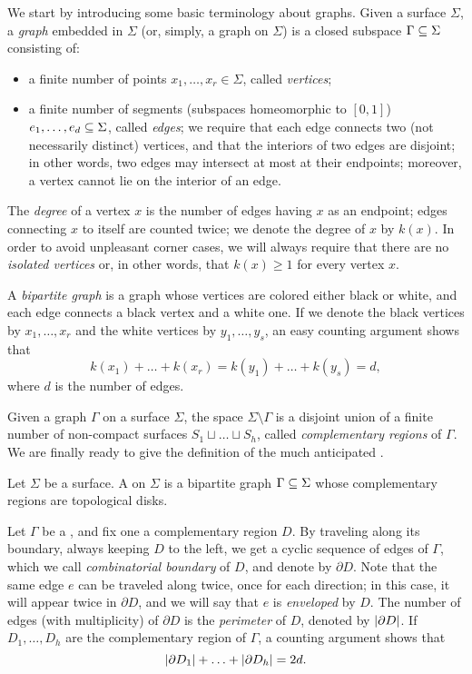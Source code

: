 We start by introducing some basic terminology about graphs. Given a surface $\Sigma$, a \emph{graph} embedded in $\Sigma$ (or, simply, a graph on $\Sigma$) is a closed subspace $\Gamma\subseteq\Sigma$ consisting of:
\begin{itemize}
\item a finite number of points $x_1,\ldots,x_r\in\Sigma$, called \emph{vertices};
\item a finite number of segments (subspaces homeomorphic to $[0,1]$) $e_1,\ldots,e_d\subseteq\Sigma$, called \emph{edges}; we require that each edge connects two (not necessarily distinct) vertices, and that the interiors of two edges are disjoint; in other words, two edges may intersect at most at their endpoints; moreover, a vertex cannot lie on the interior of an edge.
\end{itemize}
The \emph{degree} of a vertex $x$ is the number of edges having $x$ as an endpoint; edges connecting $x$ to itself are counted twice; we denote the degree of $x$ by $k(x)$. In order to avoid unpleasant corner cases, we will always require that there are no \emph{isolated vertices} or, in other words, that $k(x)\ge 1$ for every vertex $x$.

A \emph{bipartite graph} is a graph whose vertices are colored either black or white, and each edge connects a black vertex and a white one. If we denote the black vertices by $x_1,\ldots,x_r$ and the white vertices by $y_1,\ldots,y_s$, an easy counting argument shows that
\[
k(x_1)+\ldots+k(x_r)=k(y_1)+\ldots+k(y_s)=d,
\]
where $d$ is the number of edges.

Given a graph $\Gamma$ on a surface $\Sigma$, the space $\Sigma\setminus\Gamma$ is a disjoint union of a finite number of non-compact surfaces $S_1\sqcup\ldots\sqcup S_h$, called \emph{complementary regions} of $\Gamma$. We are finally ready to give the definition of the much anticipated \dessins{}.

\begin{definition}
Let $\Sigma$ be a surface. A \emph{\dessin{}} on $\Sigma$ is a bipartite graph $\Gamma\subseteq\Sigma$ whose complementary regions are topological disks.
\end{definition}


Let $\Gamma$ be a \dessin{}, and fix one a complementary region $D$. By traveling along its boundary, always keeping $D$ to the left, we get a cyclic sequence of edges of $\Gamma$, which we call \emph{combinatorial boundary} of $D$, and denote by $\partial D$. Note that the same edge $e$ can be traveled along twice, once for each direction; in this case, it will appear twice in $\partial D$, and we will say that $e$ is \emph{enveloped} by $D$. The number of edges (with multiplicity) of $\partial D$ is the \emph{perimeter} of $D$, denoted by $\lvert \partial D\rvert$. If $D_1,\ldots,D_h$ are the complementary region of $\Gamma$, a counting argument shows that
\[
\lvert \partial D_1\rvert+\ldots+\lvert \partial D_h\rvert=2d.
\]

